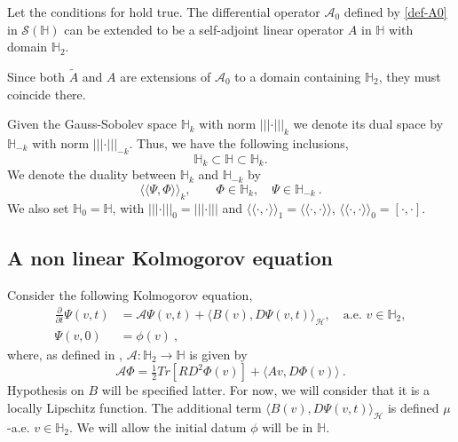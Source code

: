 \documentclass[review, onefignum, onetabnum]{siamart171218}
\begin{document}
\begin{theorem}\label{the-Pt-A1}
    Let the conditions for  hold true. The differential
    operator $\mathcal{A}_0 $  defined by \eqref{def-A0} in
    $\mathcal{S}(\mathbb{H})$ can be extended to be a self-adjoint
    linear operator $A$ in $\mathbb{H}$ with domain $\mathbb{H}_{2}$.

\end{theorem}
%
    Since both $\tilde{A}$ and $A$ are extensions of $\mathcal{A}_0 $ to a
    domain containing $\mathbb{H}_{2}$, they must coincide there.

    Given the Gauss-Sobolev space $\mathbb{H}_{k}$ with norm
$|||\cdot|||_{k} $ we denote its dual space by $\mathbb{H}_{-k}$ with norm
$|||\cdot|||_{-k}$. Thus, we have the following inclusions,
\[
    \mathbb{H}_{k} \subset \mathbb{H} \subset \mathbb{H}_{k}.
\]
We denote the duality between $ \mathbb{H}_{k}$ and $ \mathbb{H}_{-k}$ by
\[
    \langle
        \langle
            \Psi,\Phi
        \rangle
    \rangle_k,
    \qquad
    \Phi\in\mathbb{H}_{k},
    \quad \Psi\in\mathbb{H}_{-k} \ .
\]
We also set $\mathbb{H}_{0}= \mathbb{H}$,
with $|||\cdot|||_{0}= |||\cdot|||$ and
$
    \langle
        \langle
            \cdot,\cdot
        \rangle
    \rangle_1=
    \langle
        \langle
            \cdot,\cdot
        \rangle
    \rangle
$,
$
    \langle
        \langle
            \cdot,\cdot
        \rangle
    \rangle_0 = [\cdot,\cdot]
$.
\subsection{A non linear Kolmogorov equation}
Consider the following \sloppy Kolmogorov equation,
%
\begin{equation}
    \label{P1s3.1}
    \begin{aligned}
        \frac{\partial}{\partial t}
            \Psi(v,t)
            &=
               \mathcal{A}\Psi(v,t)
                +
                \langle
                    B(v),D\Psi(v,t)
                \rangle_\mathcal{H},
                \quad \text{a.e. }
                v\in\mathbb{H}_2,
        \\
        \Psi(v,0)
            &=
                \phi(v)\nonumber \ ,
    \end{aligned}
\end{equation}
%
where, as defined in ,
$\mathcal{A}:\mathbb{H}_2 \to \mathbb{H}$ is given by
%
\begin{equation}\label{def-A}
    \mathcal{A} \Phi =
        \tfrac{1}{2} Tr[RD^2 \Phi(v)]
        +
        \langle
            A v, D\Phi(v)
        \rangle \ .
 \end{equation}
Hypothesis on $B$ will be specified latter. For now, we will consider that it
is a locally Lipschitz function. The additional term
$ \langle B(v),D\Psi(v,t) \rangle_\mathcal{H}$ is defined $\mu$-a.e.
$v\in\mathbb{H}_2$. We will allow the initial datum $\phi$ will be
in $\mathbb{H}$.
\end{document}

